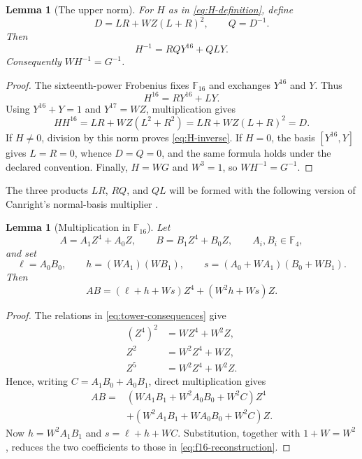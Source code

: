 \documentclass[11pt]{article}
\newtheorem{lemma}[theorem]{Lemma}
\newcommand{\F}{\mathbb F}
\begin{document}
\begin{lemma}[The upper norm]\label{lem:upper-norm}
For \(H\) as in \eqref{eq:H-definition}, define
\begin{equation}\label{eq:DQ}
 D=LR+WZ(L+R)^2,\qquad Q=D^{-1}.
\end{equation}
Then
\begin{equation}\label{eq:H-inverse}
 H^{-1}=RQY^{16}+QLY.
\end{equation}
Consequently \(W H^{-1}=G^{-1}\).
\end{lemma}

\begin{proof}
The sixteenth-power Frobenius fixes \(\F_{16}\) and exchanges
\(Y^{16}\) and \(Y\).  Thus
\[
 H^{16}=RY^{16}+LY.
\]
Using \(Y^{16}+Y=1\) and \(Y^{17}=WZ\), multiplication gives
\[
 HH^{16}=LR+WZ(L^2+R^2)=LR+WZ(L+R)^2=D.
\]
If \(H\ne0\), division by this norm proves \eqref{eq:H-inverse}.  If
\(H=0\), the basis \([Y^{16},Y]\) gives \(L=R=0\), whence \(D=Q=0\),
and the same formula holds under the declared convention.  Finally,
\(H=WG\) and \(W^3=1\), so \(WH^{-1}=G^{-1}\).
\end{proof}

The three products \(LR\), \(RQ\), and \(QL\) will be formed with the
following version of Canright's normal-basis multiplier
\cite[Sec.~2.1, Fig.~3]{canright}.

\begin{lemma}[Multiplication in \(\F_{16}\)]\label{lem:f16-product}
Let
\[
 A=A_1Z^4+A_0Z,\qquad B=B_1Z^4+B_0Z,\qquad A_i,B_i\in\F_4,
\]
and set
\begin{equation}\label{eq:f16-three-products}
 \ell=A_0B_0,\qquad h=(WA_1)(WB_1),\qquad
 s=(A_0+WA_1)(B_0+WB_1).
\end{equation}
Then
\begin{equation}\label{eq:f16-reconstruction}
 AB=(\ell+h+Ws)Z^4+(W^2h+Ws)Z.
\end{equation}
\end{lemma}

\begin{proof}
The relations in \eqref{eq:tower-consequences} give
\begin{align*}
 (Z^4)^2&=WZ^4+W^2Z,\\
 Z^2&=W^2Z^4+WZ,\\
 Z^5&=W^2Z^4+W^2Z.
\end{align*}
Hence, writing \(C=A_1B_0+A_0B_1\), direct multiplication gives
\begin{align*}
 AB={}&(WA_1B_1+W^2A_0B_0+W^2C)Z^4\\
     &+(W^2A_1B_1+WA_0B_0+W^2C)Z.
\end{align*}
Now \(h=W^2A_1B_1\) and
\(s=\ell+h+WC\).  Substitution, together with
\(1+W=W^2\), reduces the two coefficients to those in
\eqref{eq:f16-reconstruction}.
\end{proof}
\end{document}
